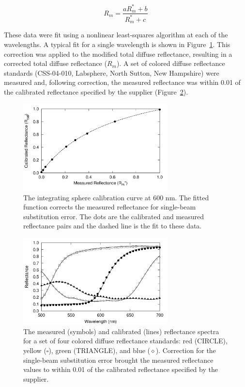 \begin{equation}
\label{eq:sbse}
	R_m = \frac{aR_m^\ast + b}{R_m^\ast + c}
\end{equation}

These data were fit using a nonlinear least-squares algorithm at each of the wavelengths. A typical fit for a single wavelength is shown in Figure~\ref{fig:p1-sbse_cf}. This correction was applied to the modified total diffuse reflectance, resulting in a corrected total diffuse reflectance ($R_m$). A set of colored diffuse reflectance standards (CSS-04-010, Labsphere, North Sutton, New Hampshire) were measured and, following correction, the measured reflectance was within 0.01 of the calibrated reflectance specified by the supplier (Figure~\ref{fig:p1-colored_refl}).

\begin{figure}
	\centering \includegraphics[width=0.7\textwidth]{figures/p1-sbse_cf.png}
	\caption[Single-beam substitution error correction curve text]{\label{fig:p1-sbse_cf}The integrating sphere calibration curve at 600 nm. The fitted function corrects the measured reflectance for single-beam substitution error. The dots are the calibrated and measured reflectance pairs and the dashed line is the fit to these data.}
\end{figure}

\begin{figure}
	\centering \includegraphics[width=0.7\textwidth]{figures/p1-colored_refl.png}
	\caption[Measured and calibrated reflectance spectra]{\label{fig:p1-colored_refl}The measured (symbols) and calibrated (lines) reflectance spectra for a set of four colored diffuse reflectance standards: red (CIRCLE), yellow ($\square$), green (TRIANGLE), and blue ($\diamond$). Correction for the single-beam substitution error brought the measured reflectance values to within 0.01 of the calibrated reflectance specified by the supplier.}
\end{figure}

